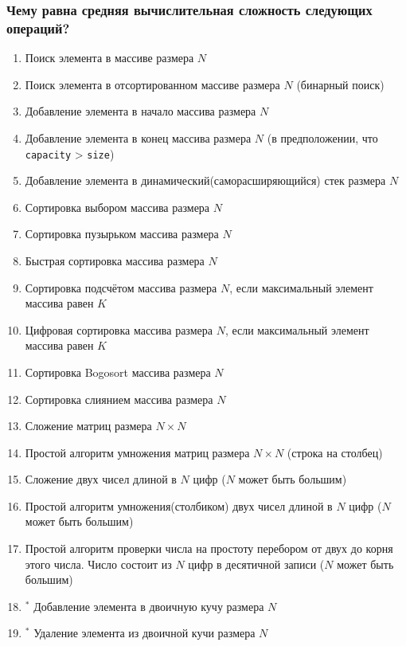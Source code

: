 \documentclass{article}
\begin{document}
\subsubsection*{Чему равна средняя вычислительная сложность следующих операций?}
\begin{enumerate}
\item Поиск элемента в массиве размера $N$
\item Поиск элемента в отсортированном массиве размера $N$ (бинарный поиск)
\item Добавление элемента в начало массива размера $N$
\item Добавление элемента в конец массива размера $N$ (в предположении, что \texttt{capacity} > \texttt{size})
\item Добавление элемента в динамический(саморасширяющийся) стек размера $N$
\item Сортировка выбором массива размера $N$
\item Сортировка пузырьком массива размера $N$
\item Быстрая сортировка массива размера $N$
\item Сортировка подсчётом массива размера $N$, если максимальный элемент массива равен $K$
\item Цифровая сортировка массива размера $N$, если максимальный элемент массива равен $K$
\item Сортировка Bogosort массива размера $N$
\item Сортировка слиянием массива размера $N$
\item Сложение матриц размера  $N \times N$
\item Простой алгоритм умножения матриц размера  $N \times N$ (строка на столбец)
\item Сложение двух чисел длиной в $N$ цифр ($N$ может быть большим)
\item Простой алгоритм умножения(столбиком) двух чисел длиной в $N$ цифр ($N$ может быть большим)
\item Простой алгоритм проверки числа на простоту перебором от двух до корня этого числа. Число состоит из $N$ цифр в десятичной записи ($N$ может быть большим)
\item $\!\!\!\!{^*}$ Добавление элемента в двоичную кучу размера $N$
\item $\!\!\!\!{^*}$ Удаление элемента из двоичной кучи размера $N$
\end{enumerate}

\newpage
\end{document}
